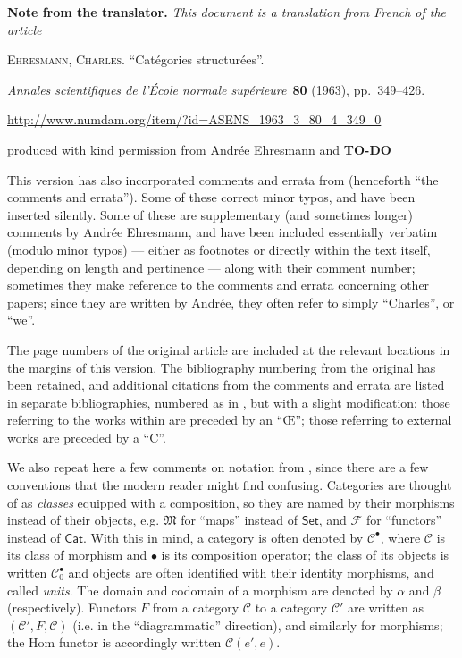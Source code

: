 \documentclass[a4paper,fleqn]{article}
\title{\sc{Structured categories}}
\author{Charles Ehresmann}
\date{1963}
\newcommand{\origcit}{%
  \textsc{Ehresmann, Charles.}
  ``Catégories structurées''.
  \par\emph{Annales scientifiques de l'École normale supérieure}~\textbf{80} (1963), pp.~349--426.
  \par\url{http://www.numdam.org/item/?id=ASENS_1963_3_80_4_349_0}
}
\newenvironment{translator}[1]
  {\phantomsection\par\medskip\noindent\small\textbf{#1.}\itshape}
  {\par\medskip}
\theoremstyle{plain}
\theoremstyle{definition}
\newcommand{\todo}{{\color{purple}\textbf{TO-DO }}}
\newcommand{\CC}{\mathcal{C}}
\newcommand{\MM}{\mathfrak{M}}
\newcommand{\FF}{\mathcal{F}}
\begin{document}
\maketitle

  \begin{translator}{Note from the translator}
    This document is a translation from French of the article

    \medskip
    {\normalfont\origcit}

    \medskip
    {\noindent}produced with kind permission from Andrée Ehresmann and \todo

    \medskip

    This version has also incorporated comments and errata from \cite[Comments on Part III-1, p.~342--363]{coll} (henceforth ``the comments and errata'').
    Some of these correct minor typos, and have been inserted silently.
    Some of these are supplementary (and sometimes longer) comments by Andrée Ehresmann, and have been included essentially verbatim (modulo minor typos) --- either as footnotes or directly within the text itself, depending on length and pertinence --- along with their comment number;
    sometimes they make reference to the comments and errata concerning other papers;
    since they are written by Andrée, they often refer to simply ``Charles'', or ``we''.

    The page numbers of the original article are included at the relevant locations in the margins of this version.
    The bibliography numbering from the original has been retained, and additional citations from the comments and errata are listed in separate bibliographies, numbered as in \cite{coll}, but with a slight modification: those referring to the works within \cite{coll} are preceded by an ``Œ''; those referring to external works are preceded by a ``C''.

    \medskip

    We also repeat here a few comments on notation from \cite[Comments on Part III-1, p.~337--338]{coll}, since there are a few conventions that the modern reader might find confusing.
    Categories are thought of as \emph{classes} equipped with a composition, so they are named by their morphisms instead of their objects, e.g. $\MM$ for ``maps'' instead of $\mathsf{Set}$, and $\FF$ for ``functors'' instead of $\mathsf{Cat}$.
    With this in mind, a category is often denoted by $\CC^\bullet$, where $\CC$ is its class of morphism and $\bullet$ is its composition operator; the class of its objects is written $\CC_0^\bullet$ and objects are often identified with their identity morphisms, and called \emph{units}.
    The domain and codomain of a morphism are denoted by $\alpha$ and $\beta$ (respectively).
    Functors $F$ from a category $\CC$ to a category $\CC'$ are written as $(\CC',F,\CC)$ (i.e. in the ``diagrammatic'' direction), and similarly for morphisms; the Hom functor is accordingly written $\CC(e',e)$.


\end{translator}
\end{document}
